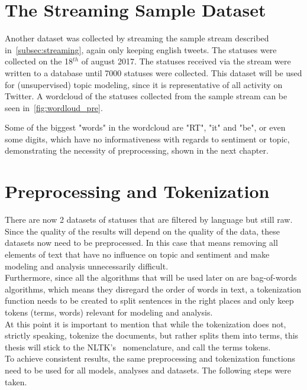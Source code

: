 \section{The Streaming Sample Dataset}
\label{sec:streamingSampleDataset}

Another dataset was collected by streaming the sample stream described in~\cref{subsec:streaming},
again only keeping english tweets.
The statuses were collected on the 18$^{th}$ of august 2017.
The statuses received via the stream were written to a database until 7000 statuses were collected.
This dataset will be used for (unsupervised) topic modeling, since it is representative of all activity on Twitter.
A wordcloud of the statuses collected from the sample stream can be seen in~\cref{fig:wordloud_pre}.

Some of the biggest "words" in the wordcloud are "RT", "it" and "be",
or even some digits, which have no informativeness with regards to sentiment or topic,
demonstrating the necessity of preprocessing, shown in the next chapter.

\section{Preprocessing and Tokenization}
\label{sec:preprocessingAndTokenization}

There are now 2 datasets of statuses that are filtered by language but still raw.
Since the quality of the results will depend on the quality of the data,
these datasets now need to be preprocessed.
In this case that means removing all elements of text that have no influence on topic and sentiment and make
modeling and analysis unnecessarily difficult.\\
Furthermore, since all the algorithms that will be used later on are bag-of-words algorithms,
which means they disregard the order of words in text, a tokenization function needs to be created
to split sentences in the right places and only keep tokens (terms, words) relevant for modeling and analysis.\\
At this point it is important to mention that while the tokenization does not, strictly speaking, tokenize the documents,
but rather splits them into terms, this thesis will stick to the NLTK's~\cite{nltkDocs} nomenclature, and call the terms tokens.\\
To achieve consistent results, the same preprocessing and tokenization functions need to be used for all models, analyses and datasets.
The following steps were taken.

